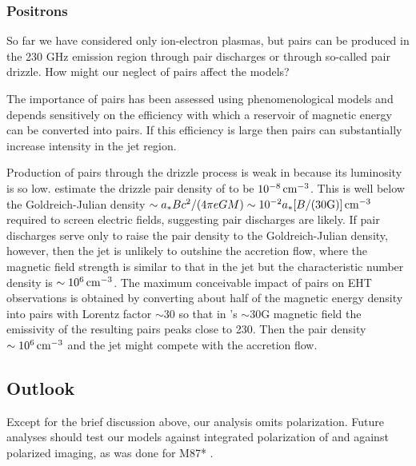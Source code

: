 \subsubsection{Positrons}\label{sec:pair}

So far we have considered only ion-electron plasmas, but pairs can be produced in the 230 GHz emission region through pair discharges or through so-called pair drizzle.
How might our neglect of pairs affect the models?

The importance of pairs has been assessed using phenomenological models \citep{2020ApJ...896...30A, 2021ApJ...923..272E} and depends sensitively on the efficiency with which a reservoir of magnetic energy can be converted into pairs.
If this efficiency is large then pairs can substantially increase intensity in the jet region.

Production of pairs through the drizzle process is weak in \sgra because its luminosity is so low.
\cite[][see also \citealt{2021ApJ...907...73W}]{2011ApJ...735....9M} estimate the drizzle pair density of \sgra to be $10^{-8}\,\mathrm{cm}^{-3}$.
This is well below the Goldreich-Julian density $\sim a_* B c^2/(4 \pi e G M) \sim 10^{-2} a_* [B/(30 {\rm G})] \,\mathrm{cm}^{-3}$ required to screen electric fields, suggesting pair discharges are likely.
If pair discharges serve only to raise the pair density to the Goldreich-Julian density, however, then the jet is unlikely to outshine the accretion flow, where the magnetic field strength is similar to that in the jet but the characteristic number density is $\sim 10^6 \,\mathrm{cm}^{-3}$.
The maximum conceivable impact of pairs on EHT observations is obtained by converting about half of the magnetic energy density into pairs with Lorentz factor $\sim 30$ so that in \sgra's $\sim 30$G magnetic field the emissivity of the resulting pairs peaks close to 230\GHz.
Then the pair density $\sim 10^{6} \,\mathrm{cm}^{-3}$ and the jet might compete with the accretion flow.

\subsection{Outlook}\label{sec:future}

Except for the brief discussion above, our analysis omits polarization.
Future analyses should test our models against integrated polarization of \sgra \citep{2021ApJ...910L..14G} and against polarized imaging, as was done for M87* .

